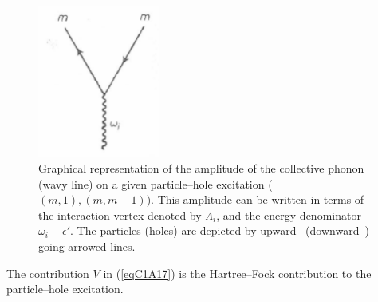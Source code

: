  \begin{figure}
 \centerline {
 \includegraphics*[width=4cm]{introduccion/figs/fig18}
 }
 \caption{Graphical representation of the amplitude of the collective phonon (wavy line) on a given particle--hole excitation ($(m,1),(m,m-1)$). This amplitude can be written in terms of the interaction vertex denoted by $\Lambda_i$, and the energy denominator $\omega_i-\epsilon'$. The particles (holes) are depicted by upward-- (downward--) going arrowed lines.}
 \label{figC1A1}
 \end{figure}
The contribution $V$ in (\ref{eqC1A17}) is the Hartree--Fock contribution to the particle--hole excitation.

